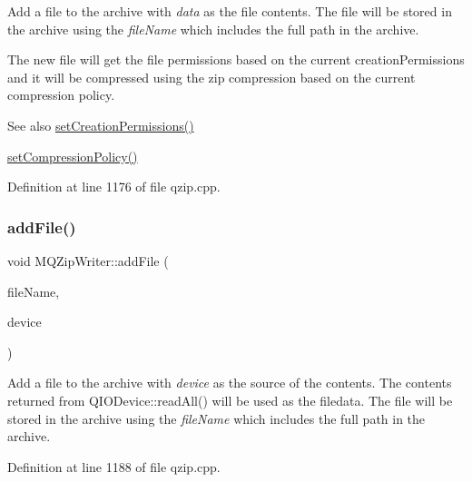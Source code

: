 Add a file to the archive with {\itshape data} as the file contents. The file will be stored in the archive using the {\itshape file\+Name} which includes the full path in the archive.

The new file will get the file permissions based on the current creation\+Permissions and it will be compressed using the zip compression based on the current compression policy.

\begin{DoxySeeAlso}{See also}
\hyperlink{class_m_q_zip_writer_af965ba3d12531a91ca0c83e25423a313}{set\+Creation\+Permissions()} 

\hyperlink{class_m_q_zip_writer_ab4f5f12ae8df67674ec0f3d30d97313f}{set\+Compression\+Policy()} 
\end{DoxySeeAlso}


Definition at line 1176 of file qzip.\+cpp.

\mbox{\label{class_m_q_zip_writer_a4233d3f0452f5c416c8f314e74308344}} 
\subsubsection{\texorpdfstring{add\+File()}{addFile()}\hspace{0.1cm}{\footnotesize\ttfamily [2/2]}}
{\footnotesize\ttfamily void M\+Q\+Zip\+Writer\+::add\+File (\begin{DoxyParamCaption}\item[{const Q\+String \&}]{file\+Name,  }\item[{Q\+I\+O\+Device $\ast$}]{device }\end{DoxyParamCaption})}

Add a file to the archive with {\itshape device} as the source of the contents. The contents returned from Q\+I\+O\+Device\+::read\+All() will be used as the filedata. The file will be stored in the archive using the {\itshape file\+Name} which includes the full path in the archive. 

Definition at line 1188 of file qzip.\+cpp.

\mbox{\label{class_m_q_zip_writer_a23bd7609856cb06487ab1c4bc0e2e2be}} 
